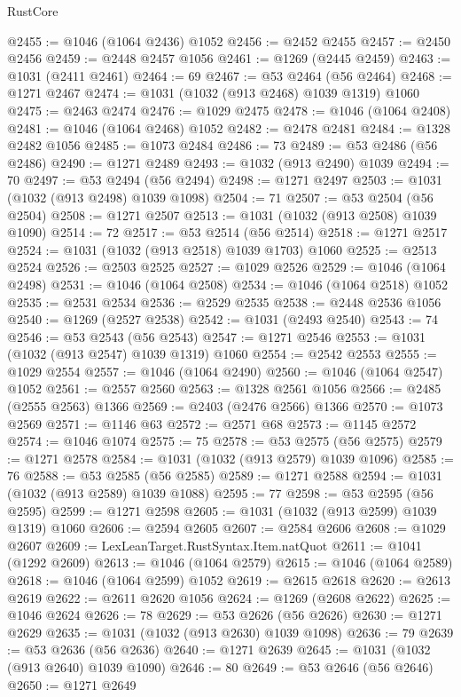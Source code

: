 \begin{lexlean}{RustCore}
\begin{coremodule}
@2455 := @1046 (@1064 @2436) @1052
@2456 := @2452 @2455
@2457 := @2450 @2456
@2459 := @2448 @2457 @1056
@2461 := @1269 (@2445 @2459)
@2463 := @1031 (@2411 @2461)
@2464 := 69
@2467 := @53 @2464 (@56 @2464)
@2468 := @1271 @2467
@2474 := @1031 (@1032 (@913 @2468) @1039 @1319) @1060
@2475 := @2463 @2474
@2476 := @1029 @2475
@2478 := @1046 (@1064 @2408)
@2481 := @1046 (@1064 @2468) @1052
@2482 := @2478 @2481
@2484 := @1328 @2482 @1056
@2485 := @1073 @2484
@2486 := 73
@2489 := @53 @2486 (@56 @2486)
@2490 := @1271 @2489
@2493 := @1032 (@913 @2490) @1039
@2494 := 70
@2497 := @53 @2494 (@56 @2494)
@2498 := @1271 @2497
@2503 := @1031 (@1032 (@913 @2498) @1039 @1098)
@2504 := 71
@2507 := @53 @2504 (@56 @2504)
@2508 := @1271 @2507
@2513 := @1031 (@1032 (@913 @2508) @1039 @1090)
@2514 := 72
@2517 := @53 @2514 (@56 @2514)
@2518 := @1271 @2517
@2524 := @1031 (@1032 (@913 @2518) @1039 @1703) @1060
@2525 := @2513 @2524
@2526 := @2503 @2525
@2527 := @1029 @2526
@2529 := @1046 (@1064 @2498)
@2531 := @1046 (@1064 @2508)
@2534 := @1046 (@1064 @2518) @1052
@2535 := @2531 @2534
@2536 := @2529 @2535
@2538 := @2448 @2536 @1056
@2540 := @1269 (@2527 @2538)
@2542 := @1031 (@2493 @2540)
@2543 := 74
@2546 := @53 @2543 (@56 @2543)
@2547 := @1271 @2546
@2553 := @1031 (@1032 (@913 @2547) @1039 @1319) @1060
@2554 := @2542 @2553
@2555 := @1029 @2554
@2557 := @1046 (@1064 @2490)
@2560 := @1046 (@1064 @2547) @1052
@2561 := @2557 @2560
@2563 := @1328 @2561 @1056
@2566 := @2485 (@2555 @2563) @1366
@2569 := @2403 (@2476 @2566) @1366
@2570 := @1073 @2569
@2571 := @1146 @63
@2572 := @2571 @68
@2573 := @1145 @2572
@2574 := @1046 @1074
@2575 := 75
@2578 := @53 @2575 (@56 @2575)
@2579 := @1271 @2578
@2584 := @1031 (@1032 (@913 @2579) @1039 @1096)
@2585 := 76
@2588 := @53 @2585 (@56 @2585)
@2589 := @1271 @2588
@2594 := @1031 (@1032 (@913 @2589) @1039 @1088)
@2595 := 77
@2598 := @53 @2595 (@56 @2595)
@2599 := @1271 @2598
@2605 := @1031 (@1032 (@913 @2599) @1039 @1319) @1060
@2606 := @2594 @2605
@2607 := @2584 @2606
@2608 := @1029 @2607
@2609 := LexLeanTarget.RustSyntax.Item.natQuot
@2611 := @1041 (@1292 @2609)
@2613 := @1046 (@1064 @2579)
@2615 := @1046 (@1064 @2589)
@2618 := @1046 (@1064 @2599) @1052
@2619 := @2615 @2618
@2620 := @2613 @2619
@2622 := @2611 @2620 @1056
@2624 := @1269 (@2608 @2622)
@2625 := @1046 @2624
@2626 := 78
@2629 := @53 @2626 (@56 @2626)
@2630 := @1271 @2629
@2635 := @1031 (@1032 (@913 @2630) @1039 @1098)
@2636 := 79
@2639 := @53 @2636 (@56 @2636)
@2640 := @1271 @2639
@2645 := @1031 (@1032 (@913 @2640) @1039 @1090)
@2646 := 80
@2649 := @53 @2646 (@56 @2646)
@2650 := @1271 @2649

\end{coremodule}
\end{lexlean}
